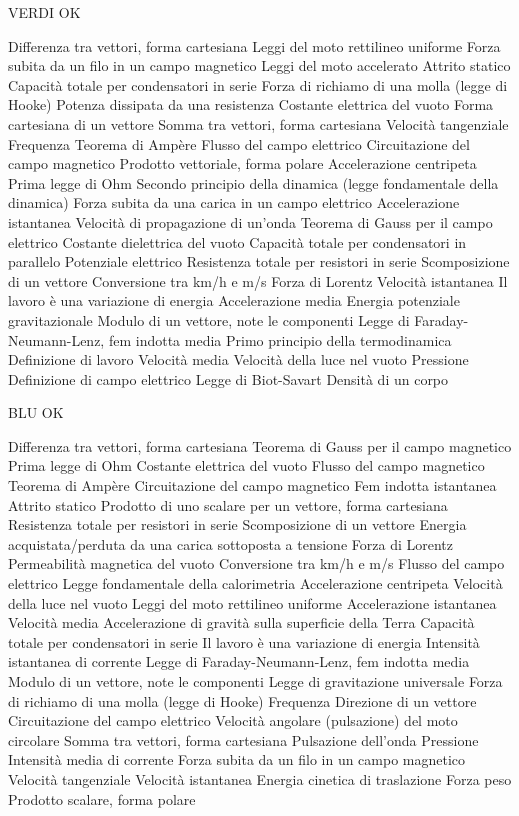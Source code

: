 \documentclass[a4paper,11pt,italian]{article}
\begin{document}
VERDI OK
\begin{enumerate}
{Differenza tra vettori, forma cartesiana}
{Leggi del moto rettilineo uniforme}
{Forza subita da un filo in un campo magnetico}
{Leggi del moto accelerato}
{Attrito statico}
{Capacità totale per condensatori in serie}
{Forza di richiamo di una molla (legge di Hooke)}
{Potenza dissipata da una resistenza}
{Costante elettrica del vuoto }
{Forma cartesiana di un vettore}
{Somma tra vettori, forma cartesiana}
{Velocità tangenziale}
{Frequenza }
{Teorema di Ampère}
{Flusso del campo elettrico}
{Circuitazione del campo magnetico}
{Prodotto vettoriale, forma polare}
{Accelerazione centripeta}
{Prima legge di Ohm}
{Secondo principio della dinamica (legge fondamentale della dinamica)}
{Forza subita da una carica in un campo elettrico}
{Accelerazione istantanea}
{Velocità di propagazione di un'onda}
{Teorema di Gauss per il campo elettrico}
{Costante dielettrica del vuoto}
{Capacità totale per condensatori in parallelo}
{Potenziale elettrico}
{Resistenza totale per resistori in serie}
{Scomposizione di un vettore}
{Conversione tra km/h e m/s}
{Forza di Lorentz}
{Velocità istantanea}
{Il lavoro è una variazione di energia}
{Accelerazione media}
{Energia potenziale gravitazionale}
{Modulo di un vettore, note le componenti}
{Legge di Faraday-Neumann-Lenz, fem indotta media}
{Primo principio della termodinamica}
{Definizione di lavoro}
{Velocità media}
{Velocità della luce nel vuoto}
{Pressione }
{Definizione di campo elettrico}
{Legge di Biot-Savart}
{Densità di un corpo}
\end{enumerate}





BLU OK
\begin{enumerate}
{Differenza tra vettori, forma cartesiana}
{Teorema di Gauss per il campo magnetico}
{Prima legge di Ohm}
{Costante elettrica del vuoto }
{Flusso del campo magnetico}
{Teorema di Ampère }
{Circuitazione del campo magnetico}
{Fem indotta istantanea}
{Attrito statico}
{Prodotto di uno scalare per un vettore, forma cartesiana}
{Resistenza totale per resistori in serie}
{Scomposizione di un vettore}
{Energia acquistata/perduta da una carica sottoposta a tensione}
{Forza di Lorentz}
{Permeabilità magnetica del vuoto}
{Conversione tra km/h e m/s}
{Flusso del campo elettrico}
{Legge fondamentale della calorimetria}
{Accelerazione centripeta}
{Velocità della luce nel vuoto}
{Leggi del moto rettilineo uniforme}
{Accelerazione istantanea}
{Velocità media}
{Accelerazione di gravità sulla superficie della Terra }
{Capacità totale per condensatori in serie}
{Il lavoro è una variazione di energia}
{Intensità istantanea di corrente}
{Legge di Faraday-Neumann-Lenz, fem indotta media}
{Modulo di un vettore, note le componenti}
{Legge di gravitazione universale}
{Forza di richiamo di una molla (legge di Hooke)}
{Frequenza}
{Direzione di un vettore }
{Circuitazione del campo elettrico}
{Velocità angolare (pulsazione) del moto circolare}
{Somma tra vettori, forma cartesiana}
{Pulsazione dell'onda}
{Pressione }
{Intensità media di corrente}
{Forza subita da un filo in un campo magnetico}
{Velocità tangenziale}
{Velocità istantanea}
{Energia cinetica di traslazione}
{Forza peso}
{Prodotto scalare, forma polare}
\end{enumerate}
\end{document}
